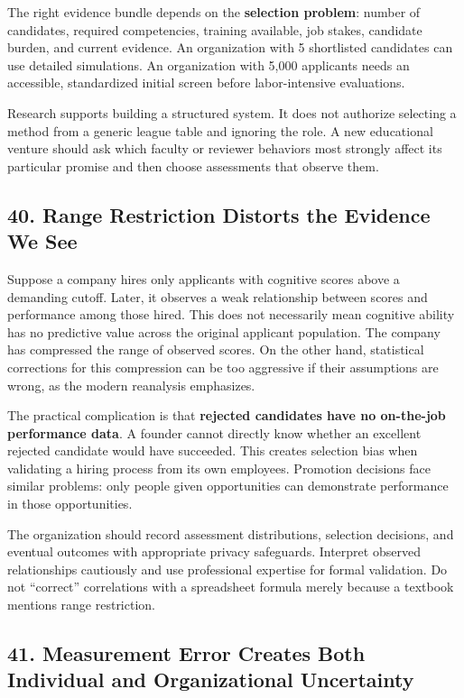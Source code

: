 The right evidence bundle depends on the \textbf{selection problem}: number of candidates, required competencies, training available, job stakes, candidate burden, and current evidence. An organization with 5 shortlisted candidates can use detailed simulations. An organization with 5,000 applicants needs an accessible, standardized initial screen before labor-intensive evaluations.

Research supports building a structured system. It does not authorize selecting a method from a generic league table and ignoring the role. A new educational venture should ask which faculty or reviewer behaviors most strongly affect its particular promise and then choose assessments that observe them.

\subsection*{40. Range Restriction Distorts the Evidence We See}

Suppose a company hires only applicants with cognitive scores above a demanding cutoff. Later, it observes a weak relationship between scores and performance among those hired. This does not necessarily mean cognitive ability has no predictive value across the original applicant population. The company has compressed the range of observed scores. On the other hand, statistical corrections for this compression can be too aggressive if their assumptions are wrong, as the modern reanalysis emphasizes.

The practical complication is that \textbf{rejected candidates have no on-the-job performance data}. A founder cannot directly know whether an excellent rejected candidate would have succeeded. This creates selection bias when validating a hiring process from its own employees. Promotion decisions face similar problems: only people given opportunities can demonstrate performance in those opportunities.

The organization should record assessment distributions, selection decisions, and eventual outcomes with appropriate privacy safeguards. Interpret observed relationships cautiously and use professional expertise for formal validation. Do not ``correct'' correlations with a spreadsheet formula merely because a textbook mentions range restriction.

\subsection*{41. Measurement Error Creates Both Individual and Organizational Uncertainty}


